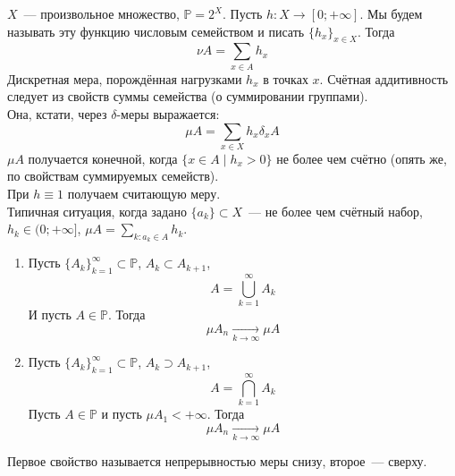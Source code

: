 \documentclass{article}
\begin{document}
    \begin{example}
        $X$~--- произвольное множество, $\mathbb P=2^X$. Пусть $h\colon X\to[0;+\infty]$. Мы будем называть эту функцию числовым семейством и писать $\{h_x\}_{x\in X}$. Тогда
        $$
        \nu A=\sum\limits_{x\in A}h_x
        $$
        Дискретная мера, порождённая нагрузками $h_x$ в точках $x$. Счётная аддитивность следует из свойств суммы семейства (о суммировании группами).\\
        Она, кстати, через $\delta$-меры выражается:
        $$
        \mu A=\sum\limits_{x\in X}h_x\delta_xA
        $$
        $\mu A$ получается конечной, когда $\{x\in A\mid h_x>0\}$ не более чем счётно (опять же, по свойствам суммируемых семейств).\\
        При $h\equiv1$ получаем считающую меру.\\
        Типичная ситуация, когда задано $\{a_k\}\subset X$~--- не более чем счётный набор, $h_k\in(0;+\infty]$, $\mu A=\sum\limits_{k:a_k\in A}h_k$.
    \end{example}
    \begin{theorem}
        \label{Непрерывность меры}
        \begin{enumerate}
            \item Пусть $\{A_k\}_{k=1}^\infty\subset\mathbb P$, $A_k\subset A_{k+1}$,
            $$
            A=\bigcup\limits_{k=1}^\infty A_k
            $$
            И пусть $A\in\mathbb P$. Тогда
            $$
            \mu A_n\underset{k\to\infty}\longrightarrow\mu A
            $$
            \item Пусть $\{A_k\}_{k=1}^\infty\subset\mathbb P$, $A_k\supset A_{k+1}$,
            $$
            A=\bigcap\limits_{k=1}^\infty A_k
            $$
            Пусть $A\in\mathbb P$ и пусть $\mu A_1<+\infty$. Тогда
            $$
            \mu A_n\underset{k\to\infty}\longrightarrow\mu A
            $$
        \end{enumerate}
        Первое свойство называется непрерывностью меры снизу, второе~--- сверху.
    \end{theorem}
\end{document}
